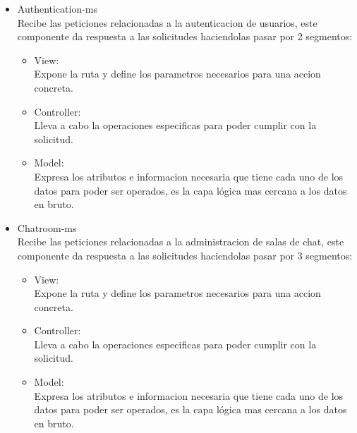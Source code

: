 \begin{itemize}
\begin{itemize}
        \item Authentication-ms \\
        Recibe las peticiones relacionadas a la autenticacion de usuarios, este componente da respuesta a las solicitudes haciendolas pasar por 2 segmentos:
        \begin{itemize}
            \item View: \\
            Expone la ruta y define los parametros necesarios para una accion concreta.
            \item Controller: \\
            Lleva a cabo la operaciones especificas para poder cumplir con la solicitud.
            \item Model: \\
            Expresa los atributos e informacion necesaria que tiene cada uno de los datos para poder ser operados, es la capa lógica mas cercana a los datos en bruto.
        \end{itemize}
        
        \item Chatroom-ms \\
        Recibe las peticiones relacionadas a la administracion de salas de chat, este componente da respuesta a las solicitudes haciendolas pasar por 3 segmentos:
        \begin{itemize}
            \item View: \\
            Expone la ruta y define los parametros necesarios para una accion concreta.
            \item Controller: \\
            Lleva a cabo la operaciones especificas para poder cumplir con la solicitud.
            \item Model: \\
            Expresa los atributos e informacion necesaria que tiene cada uno de los datos para poder ser operados, es la capa lógica mas cercana a los datos en bruto.
        \end{itemize}
        

\end{itemize}
\end{itemize}
